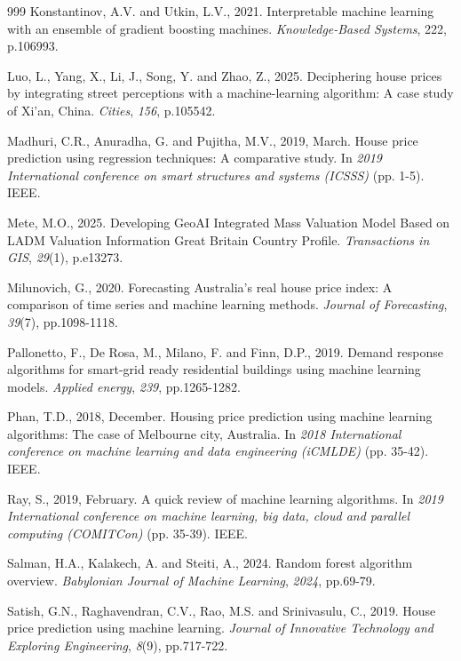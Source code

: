 \documentclass[12pt, a4paper, oneside]{book}
\begin{document}
\begin{thebibliography}{999}
Konstantinov, A.V. and Utkin, L.V., 2021. Interpretable machine learning with an ensemble of gradient boosting machines. \emph{Knowledge-Based Systems}, 222, p.106993.

Luo, L., Yang, X., Li, J., Song, Y. and Zhao, Z., 2025. Deciphering house prices by integrating street perceptions with a machine-learning algorithm: A case study of Xi'an, China. \emph{Cities}, \emph{156}, p.105542.

Madhuri, C.R., Anuradha, G. and Pujitha, M.V., 2019, March. House price prediction using regression techniques: A comparative study. In \emph{2019 International conference on smart structures and systems (ICSSS)} (pp. 1-5). IEEE.

Mete, M.O., 2025. Developing GeoAI Integrated Mass Valuation Model Based on LADM Valuation Information Great Britain Country Profile. \emph{Transactions in GIS}, \emph{29}(1), p.e13273.

Milunovich, G., 2020. Forecasting Australia's real house price index: A comparison of time series and machine learning methods. \emph{Journal of Forecasting}, \emph{39}(7), pp.1098-1118.

Pallonetto, F., De Rosa, M., Milano, F. and Finn, D.P., 2019. Demand response algorithms for smart-grid ready residential buildings using machine learning models. \emph{Applied energy}, \emph{239}, pp.1265-1282.

Phan, T.D., 2018, December. Housing price prediction using machine learning algorithms: The case of Melbourne city, Australia. In \emph{2018 International conference on machine learning and data engineering (iCMLDE)} (pp. 35-42). IEEE.

Ray, S., 2019, February. A quick review of machine learning algorithms. In \emph{2019 International conference on machine learning, big data, cloud and parallel computing (COMITCon)} (pp. 35-39). IEEE.

Salman, H.A., Kalakech, A. and Steiti, A., 2024. Random forest algorithm overview. \emph{Babylonian Journal of Machine Learning}, \emph{2024}, pp.69-79.

Satish, G.N., Raghavendran, C.V., Rao, M.S. and Srinivasulu, C., 2019. House price prediction using machine learning. \emph{Journal of Innovative Technology and Exploring Engineering}, \emph{8}(9), pp.717-722.


\end{thebibliography}
\end{document}
